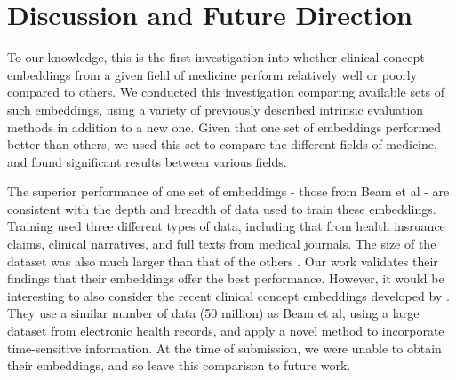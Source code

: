 \documentclass[11pt,a4paper]{article}
\def\blu#1{{\textbf{\color{blu}#1}}}
\def\ora#1{{\textbf{\color{ora}#1}}}
\begin{document}

\section{Discussion and Future Direction}
To our knowledge, this is the first investigation into whether clinical concept embeddings from a given field of medicine perform relatively well or poorly compared to others. We conducted this investigation comparing available sets of such embeddings, using a variety of previously described intrinsic evaluation methods in addition to a new one. Given that one set of embeddings performed better than others, we used this set to compare the different fields of medicine, and found significant results between various fields. 

The superior performance of one set of embeddings - those from Beam et al  - are consistent with the depth and breadth of data used to train these embeddings. Training used three different types of data, including that from health insruance claims, clinical narratives, and full texts from medical journals. The size of the dataset was also much larger than that of the others . Our work validates their findings that their embeddings offer the best performance. However, it would be interesting to also consider the recent clinical concept embeddings developed by \cite{xiangTimesensitiveClinicalConcept2019}. They use a similar number of data (50 million) as Beam et al, using a large dataset from electronic health records, and apply a novel method to incorporate time-sensitive information. At the time of submission, we were unable to obtain their embeddings, and so leave this comparison to future work.
\end{document}
